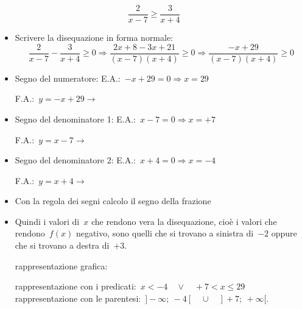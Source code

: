  \begin{esempio}
\[\frac{2}{x-7} \ge \frac{3}{x+4}\]
\begin{itemize}
 \item Scrivere la disequazione in forma normale:
 \[\frac{2}{x-7} - \frac{3}{x+4} \ge 0 \Rightarrow 
   \frac{2 x +8 -3x +21}{(x-7)(x+4)} \ge 0 \Rightarrow
   \frac{-x +29}{(x-7)(x+4)} \ge 0\]
 \item Segno del numeratore:
 \subitem E.A.:~$-x +29=0 \Rightarrow x=29$
 \subitem
  \begin{minipage}{.25\textwidth}
   F.A.:~$y=-x +29 \rightarrow $
  \end{minipage}
  \begin{minipage}{.30\textwidth}
  
  \end{minipage}
 \item Segno del denominatore 1:
 \subitem E.A.:~$x -7=0 \Rightarrow x=+7$
 \subitem
  \begin{minipage}{.25\textwidth}
   F.A.:~$y=x -7 \rightarrow $
  \end{minipage}
  \begin{minipage}{.30\textwidth}
  
  \end{minipage}
 \item Segno del denominatore 2:
 \subitem E.A.:~$x +4=0 \Rightarrow x=-4$
 \subitem
  \begin{minipage}{.25\textwidth}
   F.A.:~$y=x +4 \rightarrow $
  \end{minipage}
  \begin{minipage}{.30\textwidth}
  
  \end{minipage}
 \item Con la regola dei segni calcolo il segno della frazione 
   
 \item Quindi i valori di~$x$ che rendono vera la disequazione, cioè i valori
  che rendono~$f(x)$ negativo, sono quelli 
  che si trovano a sinistra di~$-2$ oppure che si trovano a destra di~$+3$. 
 \subitem 
  \begin{minipage}{.35\textwidth}
   rappresentazione grafica: 
  \end{minipage}
  \begin{minipage}{.30\textwidth}
   
  \end{minipage}
 \subitem rappresentazione con i 
  predicati:~$x < -4 \quad \lor \quad +7 < x \le 29$ 
 \subitem rappresentazione con le 
  parentesi:~$]-\infty;~-4[ \quad \cup \quad ]+7;~+\infty[$. 
\end{itemize}
 \end{esempio}

